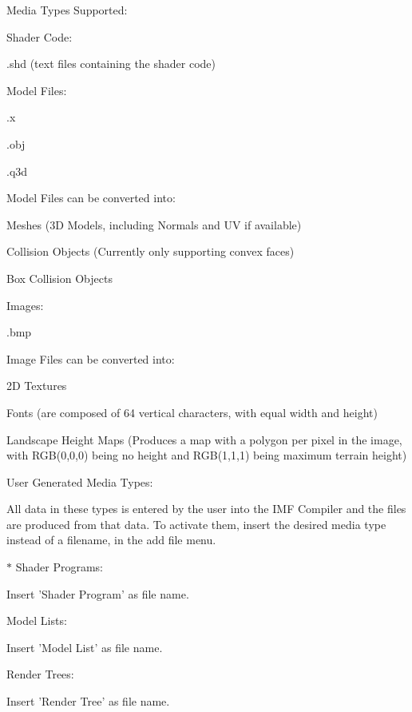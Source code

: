 Media Types Supported:\par
 Shader Code:\par
 .shd (text files containing the shader code)\par
 Model Files:\par
 .x\par
 .obj\par
 .q3d\par
 Model Files can be converted into:\par
 Meshes (3D Models, including Normals and UV if available)\par
 Collision Objects (Currently only supporting convex faces)\par
 Box Collision Objects \par
 Images:\par
 .bmp\par
 Image Files can be converted into:\par
 2D Textures\par
 Fonts (are composed of 64 vertical characters, with equal width and height)\par
 Landscape Height Maps (Produces a map with a polygon per pixel in the image, with RGB(0,0,0) being no height and RGB(1,1,1) being maximum terrain height)\par
 \par
 User Generated Media Types:\par
 All data in these types is entered by the user into the IMF Compiler and the files are produced from that data. To activate them, insert the desired media type instead of a filename, in the add file menu.\par
 $\ast$ Shader Programs:\par
 Insert 'Shader Program' as file name.\par
 Model Lists:\par
 Insert 'Model List' as file name.\par
 Render Trees:\par
 Insert 'Render Tree' as file name.\par
 